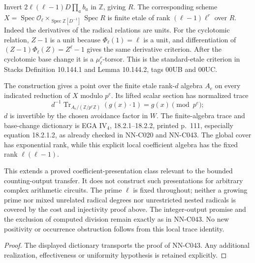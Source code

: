 \begin{geometricstatement}[NN-C043]
Invert $2\ell(\ell-1)D\prod_a b_a$ in $\mathbb Z$, giving $R$.
The corresponding scheme $X=\operatorname{Spec}\mathcal O_\ell
\times_{\operatorname{Spec}\mathbb Z[D^{-1}]}\operatorname{Spec}R$
is finite etale of rank $(\ell-1)\ell^r$ over $R$.
Indeed the derivatives of the radical relations are units.
For the cyclotomic relation, $Z-1$ is a unit because
$\Phi_\ell(1)=\ell$ is a unit, and differentiation of
$(Z-1)\Phi_\ell(Z)=Z^\ell-1$ gives the same derivative criterion.
After the cyclotomic base change it is a $\mu_\ell^r$-torsor.
This is the standard-etale criterion in Stacks
Definition 10.144.1 and Lemma 10.144.2, tags 00UB and 00UC.

The construction gives a point over the finite etale rank-$d$
algebra $A_e$ on every indicated reduction of $X$ modulo $p^e$.
Its lifted scalar section has normalized trace
\[
       d^{-1}\operatorname{Tr}_{A_e/(\mathbb Z/p^e\mathbb Z)}
                          (g(x)\cdot1)=g(x)\pmod{p^e};
\]
$d$ is invertible by the chosen avoidance factor in $W$.
The finite-algebra trace and base-change dictionary is
EGA IV$_4$, 18.2.1--18.2.2, printed p.~111, especially
equation 18.2.1.2, as already checked in NN-C020 and NN-C043.
The global cover has exponential rank, while this explicit
local coefficient algebra has the fixed rank $\ell(\ell-1)$.

This extends a proved coefficient-presentation class relevant
to the bounded counting-output transfer. It does not construct
such presentations for arbitrary complex arithmetic circuits.
The prime $\ell$ is fixed throughout; neither a growing prime
nor mixed unrelated radical degrees nor unrestricted nested
radicals is covered by the cost and injectivity proof above.
The integer-output promise and the exclusion of computed
division remain exactly as in NN-C043. No new positivity or
occurrence obstruction follows from this local trace identity.
\end{geometricstatement}
\begin{proof} The displayed dictionary transports the proof of NN-C043. Any additional realization, effectiveness or uniformity hypothesis is retained explicitly.\end{proof}


